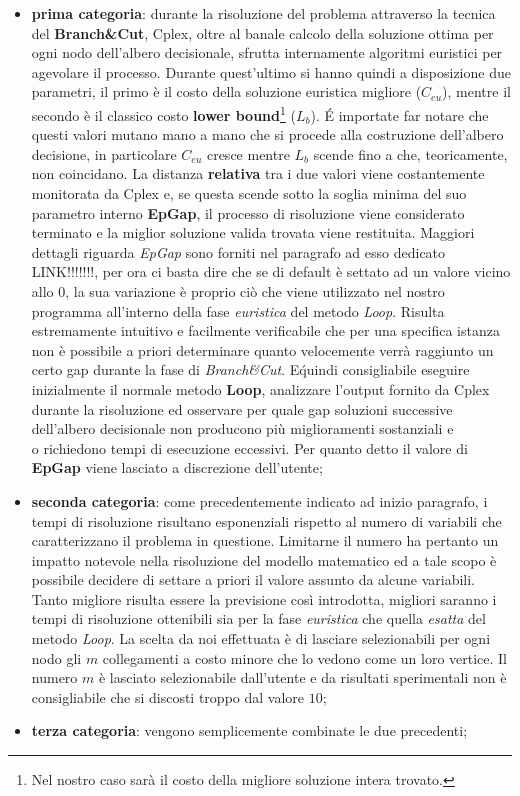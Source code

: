 \documentclass[11pt]{article}
\begin{document}
\begin{itemize}
    \item \textbf{prima categoria}: durante la risoluzione del problema attraverso la tecnica del \textbf{Branch\&Cut}, Cplex, oltre al banale calcolo della soluzione ottima per ogni nodo dell'albero decisionale, sfrutta internamente algoritmi euristici per agevolare il processo. Durante quest'ultimo si hanno quindi a disposizione due parametri, il primo è il costo della soluzione euristica migliore (\textbf{$C_{eu}$}), mentre il secondo è il classico costo \textbf{lower bound}\footnote{Nel nostro caso sarà il costo della migliore soluzione intera trovato.} (\textbf{$L_{b}$}). \'E importate far notare che questi valori mutano mano a mano che si procede alla costruzione dell'albero decisione, in particolare \textbf{$C_{eu}$} cresce mentre \textbf{$L_{b}$} scende fino a che, teoricamente, non coincidano.
    La distanza \textbf{relativa} tra i due valori viene costantemente monitorata da Cplex e, se questa scende sotto la soglia minima del suo parametro interno \textbf{EpGap}, il processo di risoluzione viene considerato terminato e la miglior soluzione valida trovata viene restituita. Maggiori dettagli riguarda \textit{EpGap} sono forniti nel paragrafo ad esso dedicato LINK!!!!!!!, per ora ci basta dire che se di default è settato ad un valore vicino allo $0$, la sua variazione è proprio ciò che viene utilizzato nel nostro programma all'interno della fase \textit{euristica} del metodo \textit{Loop}.
    Risulta estremamente intuitivo e facilmente verificabile che per una specifica istanza non è possibile a priori determinare quanto velocemente verrà raggiunto un certo gap durante la fase di \textit{Branch\&Cut}. E\' quindi consigliabile eseguire inizialmente il normale metodo \textbf{Loop}, analizzare l'output fornito da Cplex durante la risoluzione ed osservare per quale gap soluzioni successive dell'albero decisionale non producono più miglioramenti sostanziali e\\o richiedono tempi di esecuzione eccessivi. Per quanto detto il valore di \textbf{EpGap} viene lasciato a discrezione dell'utente;
    \item \textbf{seconda categoria}: come precedentemente indicato ad inizio paragrafo, i tempi di risoluzione risultano esponenziali rispetto al numero di variabili che caratterizzano il problema in questione. Limitarne il numero ha pertanto un impatto notevole nella risoluzione del modello matematico ed a tale scopo è possibile decidere di settare a priori il valore assunto da alcune variabili. Tanto migliore risulta essere la previsione così introdotta, migliori saranno i tempi di risoluzione ottenibili sia per la fase \textit{euristica} che quella \textit{esatta} del metodo \textit{Loop}. La scelta da noi effettuata è di lasciare selezionabili per ogni nodo gli $m$ collegamenti a costo minore che lo vedono come un loro vertice. Il numero $m$ è lasciato selezionabile dall'utente e da risultati sperimentali non è consigliabile che si discosti troppo dal valore $10$;
    \item \textbf{terza categoria}: vengono semplicemente combinate le due precedenti;
\end{itemize}
\end{document}
